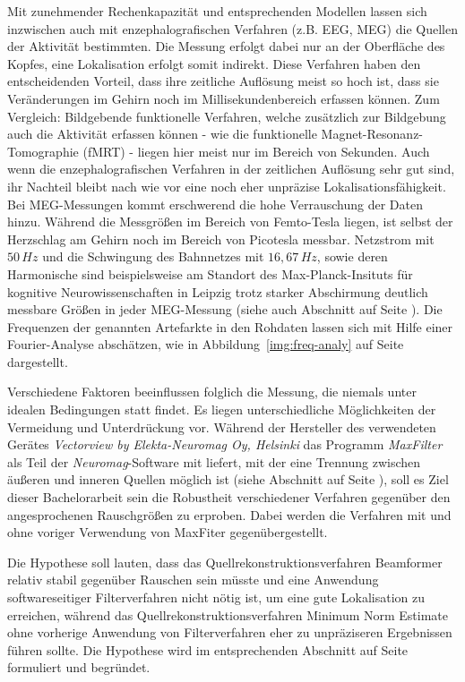 \documentclass[doc,a4paper,12pt]{apa6}
\makeatletter
\DeclareRobustCommand*{\nameref}[1]{%
      \glqq{\myorg@nameref{#1}}\grqq%
    }%
\makeatother
\begin{document}
Mit zunehmender Rechenkapazität und entsprechenden Modellen lassen sich inzwischen auch mit enzephalografischen Verfahren (z.B. EEG, MEG) die Quellen der Aktivität bestimmten. Die Messung erfolgt dabei nur an der Oberfläche des Kopfes, eine Lokalisation erfolgt somit indirekt. Diese Verfahren haben den entscheidenden Vorteil, dass ihre zeitliche Auflösung meist so hoch ist, dass sie Veränderungen im Gehirn noch im Millisekundenbereich erfassen können. Zum Vergleich: Bildgebende funktionelle Verfahren, welche zusätzlich zur Bildgebung auch die Aktivität erfassen können - wie die funktionelle Magnet-Resonanz-Tomographie (fMRT) - liegen hier meist nur im Bereich von Sekunden. Auch wenn die enzephalografischen Verfahren in der zeitlichen Auflösung sehr gut sind, ihr Nachteil bleibt nach wie vor eine noch eher unpräzise Lokalisationsfähigkeit. Bei MEG-Messungen kommt erschwerend die hohe Verrauschung der Daten hinzu. Während die Messgrößen im Bereich von Femto-Tesla liegen, ist selbst der Herzschlag am Gehirn noch im Bereich von Picotesla messbar. Netzstrom mit $50\,Hz$ und die Schwingung des Bahnnetzes mit $16,67\,Hz$, sowie deren Harmonische sind beispielsweise am Standort des Max-Planck-Insituts für kognitive Neurowissenschaften in Leipzig trotz starker Abschirmung deutlich messbare Größen in jeder MEG-Messung (siehe auch Abschnitt \nameref{sec:rauschen} auf Seite \pageref{sec:rauschen}). Die Frequenzen der genannten Artefarkte in den Rohdaten lassen sich mit Hilfe einer Fourier-Analyse abschätzen, wie in Abbildung~\ref{img:freq-analy} auf Seite~\pageref{img:freq-analy} dargestellt.

Verschiedene Faktoren beeinflussen folglich die Messung, die niemals unter idealen Bedingungen statt findet. Es liegen unterschiedliche Möglichkeiten der Vermeidung und Unterdrückung vor. Während der Hersteller des verwendeten Gerätes \emph{Vectorview by Elekta-Neuromag Oy, Helsinki} das Programm \emph{MaxFilter} als Teil der \emph{Neuromag}-Software mit liefert, mit der eine Trennung zwischen äußeren und inneren Quellen möglich ist (siehe Abschnitt \nameref{sec:maxfilter} auf Seite \pageref{sec:maxfilter}), soll es Ziel dieser Bachelorarbeit sein die Robustheit verschiedener Verfahren gegenüber den angesprochenen Rauschgrößen zu erproben. Dabei werden die Verfahren mit und ohne voriger Verwendung von MaxFiter gegenübergestellt.

Die Hypothese soll lauten, dass das Quellrekonstruktionsverfahren Beamformer relativ stabil gegenüber Rauschen sein müsste und eine Anwendung softwareseitiger Filterverfahren nicht nötig ist, um eine gute Lokalisation zu erreichen, während das Quellrekonstruktionsverfahren Minimum Norm Estimate ohne vorherige Anwendung von Filterverfahren eher zu unpräziseren Ergebnissen führen sollte. Die Hypothese wird im entsprechenden Abschnitt auf Seite \pageref{sec:hypo} formuliert und begründet.
\end{document}
